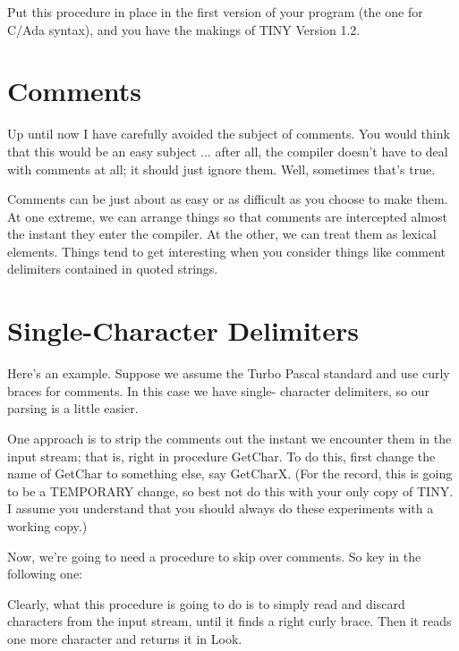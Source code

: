 \documentclass[float=false, crop=false]{standalone}
\begin{document}
Put this procedure in place in the first version of your program (the one for
C/Ada syntax), and you have the makings of TINY Version 1.2.


\section{Comments}

Up until now I have carefully avoided the subject of comments. You would think
that this would be an easy subject ... after all, the compiler doesn't have to
deal with comments at all; it should just ignore them. Well, sometimes that's
true.

Comments can be just about as easy or as difficult as you choose to make them.
At one extreme, we can arrange things so that comments are intercepted almost
the instant they enter the compiler. At the other, we can treat them as lexical
elements. Things tend to get interesting when you consider things like comment
delimiters contained in quoted strings.


\section{Single-Character Delimiters}

Here's an example. Suppose we assume the Turbo Pascal standard and use curly
braces for comments. In this case we have single- character delimiters, so our
parsing is a little easier.

One approach is to strip the comments out the instant we encounter them in the
input stream; that is, right in procedure GetChar. To do this, first change the
name of GetChar to something else, say GetCharX. (For the record, this is going
to be a TEMPORARY change, so best not do this with your only copy of TINY. I
assume you understand that you should always do these experiments with a working
copy.)

Now, we're going to need a procedure to skip over comments. So key in the
following one:

\begin{code}
{--------------------------------------------------------------}
{ Skip A Comment Field }

procedure SkipComment;
begin
   while Look <> '}' do
      GetCharX;
   GetCharX;
end;
{--------------------------------------------------------------}
\end{code}

Clearly, what this procedure is going to do is to simply read and discard
characters from the input stream, until it finds a right curly brace. Then it
reads one more character and returns it in Look.
\end{document}
